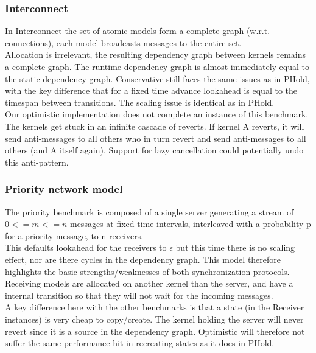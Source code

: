 \subsubsection{Interconnect}
In Interconnect
the set of atomic models form a complete graph (w.r.t. connections), each model broadcasts messages to the entire set. \\
Allocation is irrelevant, the resulting dependency graph between kernels remains  a complete graph. The runtime dependency graph is almost immediately equal to the static dependency graph.
Conservative still faces the same issues as in PHold, with the key difference that for a fixed time advance lookahead is equal to the timespan between transitions. The scaling issue is identical as in PHold.\\
Our optimistic implementation does not complete an instance of this benchmark. The kernels get stuck in an infinite cascade of reverts. If kernel A reverts, it will send anti-messages to all others who in turn revert and send anti-messages to all others (and A itself again). Support for lazy cancellation could potentially undo this anti-pattern.
\subsubsection{Priority network model}
The priority benchmark is composed of a single server generating a stream of $0<=m<=n$ messages at fixed time intervals, interleaved with a probability p for a priority message, to n receivers. \\ This defaults lookahead for the receivers to $\epsilon$ but this time there is no scaling effect, nor are there cycles in the dependency graph. This model therefore highlights the basic strengths/weaknesses of both synchronization protocols. Receiving models are allocated on another kernel than the server, and have a internal transition so that they will not wait for the incoming messages. 
 \\
A key difference here with the other benchmarks is that a state (in the Receiver instances) is very cheap to copy/create. The kernel holding the server will never revert since it is a source in the dependency graph. Optimistic will therefore not suffer the same performance hit in recreating states as it does in PHold. 


